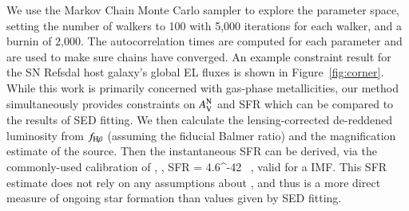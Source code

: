 We use the Markov Chain Monte Carlo sampler \emc \citep{ForemanMackey:2013io} to
explore the parameter space, setting the number of walkers to 100 with 5,000 iterations for each walker,
and a burnin of 2,000. The autocorrelation times are computed for
each parameter and are used to make sure chains have converged.
An example constraint result for the SN Refsdal host galaxy's global EL fluxes is shown in Figure~\ref{fig:corner}.
While this work is primarily concerned with gas-phase metallicities, our method simultaneously provides constraints on $A_{\rm V}^{\rm N}$ and
SFR which can be compared to the results of SED fitting.
We then calculate the lensing-corrected de-reddened \Ha luminosity from $f_{\textrm{H}\beta}$ (assuming the fiducial Balmer ratio) and the 
magnification estimate of the source.
Then the instantaneous SFR can be derived, via the commonly-used calibration of \citet{Kennicutt:1998ki,Moustakas:2010ke}, \ie,
\be
    {\rm SFR} = 4.6^{-42}~  ,
\ee
valid for a \citet{Chabrier:2003ki} IMF. This SFR estimate does not rely on any assumptions about \sfh, and thus is a more direct 
measure of ongoing star formation than values given by SED fitting.

